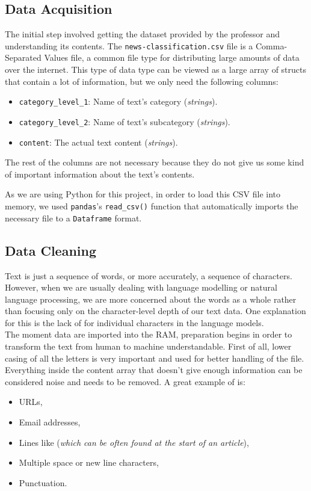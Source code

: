 \subsection{Data Acquisition}
The initial step involved getting the dataset provided by the professor and understanding its contents. The \verb|news-classification.csv| file is a Comma-Separated Values file, a common file type for distributing large amounts of data over the internet. 
This type of data type can be viewed as a large array of structs that contain a lot of information, but we only need the following columns:
\begin{itemize}
	\item \verb|category_level_1|: Name of text's category (\textit{strings}).
	\item \verb|category_level_2|: Name of text's subcategory (\textit{strings}).
	\item \verb|content|: The actual text content (\textit{strings}).
\end{itemize}
The rest of the columns are not necessary because they do not give us some kind of important information about the text's contents.

As we are using Python for this project, in order to load this CSV file into memory, we used \verb|pandas|'s \verb|read_csv()| function that automatically imports the necessary file to a \verb|Dataframe| format.

\subsection{Data Cleaning}

Text is just a sequence of words, or more accurately, a sequence of characters. However, when we are usually dealing with language modelling or natural language processing, we are more concerned about the words as a whole rather than focusing only on the character-level depth of our text data. One explanation for this is the lack of  for individual characters in the language models.\\
The moment data are imported into the RAM, preparation begins in order to transform the text from human to machine understandable. 
First of all, lower casing of all the letters is very important and used for better handling of the file.
Everything inside the content array that doesn't give enough information can be considered noise and needs to be removed.
A great example of  is:
\begin{itemize}
	\item URLs,
	\item Email addresses,
	\item Lines like  (\textit{which can be often found at the start of an article}),
	\item Multiple space or new line characters,
	\item Punctuation.
\end{itemize}  

